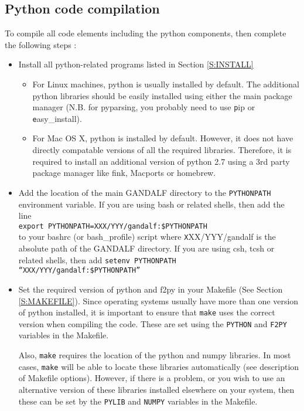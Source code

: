 \documentclass[a4paper]{article}
\newcommand{\var}[1]{\texttt{#1}}
\begin{document}
\subsection{Python code compilation}
To compile all code elements including the python components, then complete the following steps : 
\begin{itemize}

\item Install all python-related programs listed in Section \ref{S:INSTALL}

\begin{itemize}
\item For Linux machines, python is usually installed by default.  The additional python libraries should be easily installed using either the main package manager (N.B. for pyparsing, you probably need to use {\var pip} or {\var easy\_install}).
\item For Mac OS X, python is installed by default.  However, it does not have directly compatable versions of all the required libraries.  Therefore, it is required to install an additional version of python 2.7 using a 3rd party package manager like fink, Macports or homebrew.
\end{itemize}

\item Add the location of the main GANDALF directory to the \var{PYTHONPATH} environment variable.  If you are using bash or related shells, then add the line \\
\newline
\noindent \var{export PYTHONPATH=XXX/YYY/gandalf:\$PYTHONPATH} \\

\noindent to your bashrc (or bash\_profile) script where {\var XXX/YYY/gandalf} is the absolute path of the GANDALF directory.   If you are using csh, tcsh or related shells, then add
\newline
\noindent \var{setenv PYTHONPATH ``XXX/YYY/gandalf:\$PYTHONPATH''} \\

\item Set the required version of python and f2py in your Makefile (See Section \ref{S:MAKEFILE}).  Since operating systems usually have more than one version of python installed, it is important to ensure that \var{make} uses the correct version when compiling the code.  These are set using the \var{PYTHON} and \var{F2PY} variables in the Makefile.

Also, \var{make} requires the location of the python and numpy libraries.  In most cases, \var{make} will be able to locate these libraries automatically (see description of Makefile options).  However, if there is a problem, or you wish to use an alternative version of these libraries installed elsewhere on your system, then these can be set by the \var{PYLIB} and \var{NUMPY} variables in the Makefile.  



\end{itemize}
\end{document}
